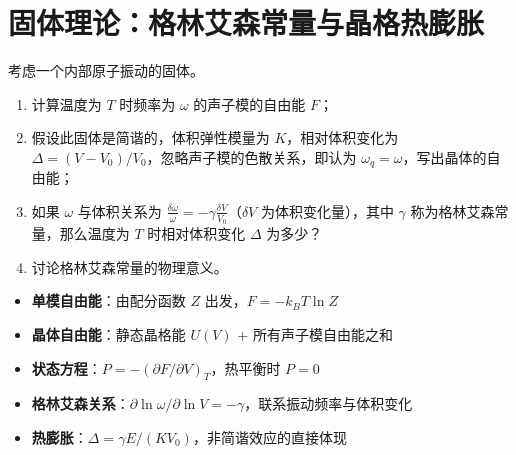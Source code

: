 \section{固体理论：格林艾森常量与晶格热膨胀}
\label{sec:gruneisen-thermal-expansion}

\begin{modelbox}[题目：简谐晶体的自由能与热膨胀]
考虑一个内部原子振动的固体。
\begin{enumerate}
    \item 计算温度为 $T$ 时频率为 $\omega$ 的声子模的自由能 $F$；
    \item 假设此固体是简谐的，体积弹性模量为 $K$，相对体积变化为 $\Delta=(V-V_0)/V_0$，忽略声子模的色散关系，即认为 $\omega_q=\omega$，写出晶体的自由能；
    \item 如果 $\omega$ 与体积关系为 $\displaystyle\frac{\delta\omega}{\omega}=-\gamma\frac{\delta V}{V_0}$（$\delta V$ 为体积变化量），其中 $\gamma$ 称为格林艾森常量，那么温度为 $T$ 时相对体积变化 $\Delta$ 为多少？
    \item 讨论格林艾森常量的物理意义。
\end{enumerate}
\end{modelbox}

\begin{tipbox}[考点快速分析]
\begin{itemize}
    \item \textbf{单模自由能}：由配分函数 $Z$ 出发，$F=-k_BT\ln Z$
    \item \textbf{晶体自由能}：静态晶格能 $U(V)$ + 所有声子模自由能之和
    \item \textbf{状态方程}：$P=-(\partial F/\partial V)_T$，热平衡时 $P=0$
    \item \textbf{格林艾森关系}：$\partial\ln\omega/\partial\ln V=-\gamma$，联系振动频率与体积变化
    \item \textbf{热膨胀}：$\Delta=\gamma E/(KV_0)$，非简谐效应的直接体现
\end{itemize}
\end{tipbox}

